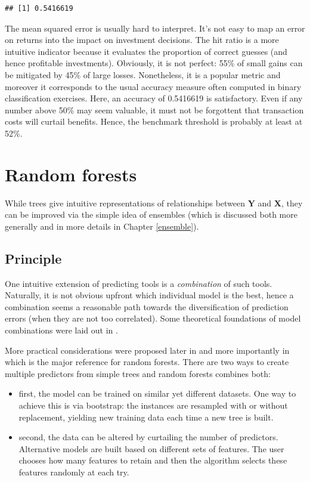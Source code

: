 \documentclass[]{krantz}
\providecommand{\tightlist}{%
  \setlength{\itemsep}{0pt}\setlength{\parskip}{0pt}}
\theoremstyle{definition}
\theoremstyle{definition}
\theoremstyle{definition}
\theoremstyle{remark}
\begin{document}
\begin{verbatim}
## [1] 0.5416619
\end{verbatim}

\normalsize

The mean squared error is usually hard to interpret. It's not easy to
map an error on returns into the impact on investment decisions. The hit
ratio is a more intuitive indicator because it evaluates the proportion
of correct guesses (and hence profitable investments). Obviously, it is
not perfect: 55\% of small gains can be mitigated by 45\% of large
losses. Nonetheless, it is a popular metric and moreover it corresponds
to the usual accuracy measure often computed in binary classification
exercises. Here, an accuracy of 0.5416619 is satisfactory. Even if any
number above 50\% may seem valuable, it must not be forgottent that
transaction costs will curtail benefits. Hence, the benchmark threshold
is probably at least at 52\%.

\hypertarget{random-forests}{%
\section{Random forests}\label{random-forests}}

While trees give intuitive representations of relationships between
\(\mathbf{Y}\) and \(\mathbf{X}\), they can be improved via the simple
idea of ensembles (which is discussed both more generally and in more
details in Chapter \ref{ensemble}).

\hypertarget{principle-1}{%
\subsection{Principle}\label{principle-1}}

One intuitive extension of predicting tools is a \emph{combination} of
such tools. Naturally, it is not obvious upfront which individual model
is the best, hence a combination seems a reasonable path towards the
diversification of prediction errors (when they are not too correlated).
Some theoretical foundations of model combinations were laid out in
\citet{schapire1990strength}.

More practical considerations were proposed later in
\citet{ho1995random} and more importantly in \citet{breiman2001random}
which is the major reference for random forests. There are two ways to
create multiple predictors from simple trees and random forests combines
both:

\begin{itemize}
\tightlist
\item
  first, the model can be trained on similar yet different datasets. One
  way to achieve this is via bootstrap: the instances are resampled with
  or without replacement, yielding new training data each time a new
  tree is built.
\item
  second, the data can be altered by curtailing the number of
  predictors. Alternative models are built based on different sets of
  features. The user chooses how many features to retain and then the
  algorithm selects these features randomly at each try.
\end{itemize}
\end{document}
